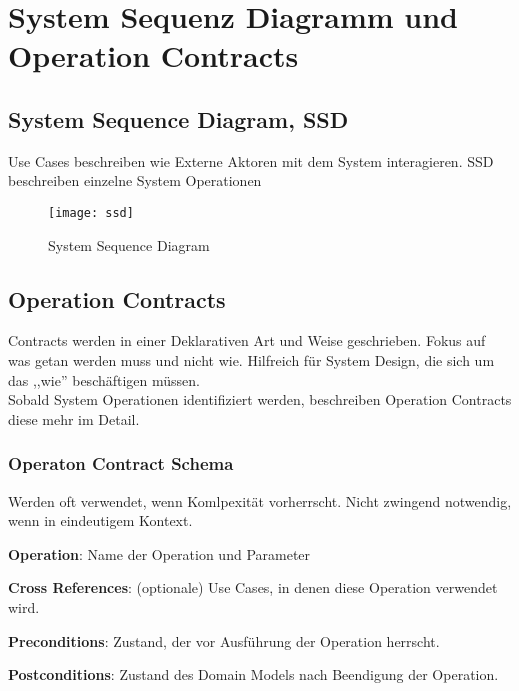 
\chapter{System Sequenz Diagramm und Operation Contracts}

\section{System Sequence Diagram, SSD}
Use Cases beschreiben wie Externe Aktoren mit dem System interagieren.
SSD beschreiben einzelne System Operationen

\begin{figure}[!h]
    \centering
    \texttt{[image: ssd]}
    \caption{System Sequence Diagram}
\end{figure}

\section{Operation Contracts}
Contracts werden in einer Deklarativen Art und Weise geschrieben. Fokus auf
was getan werden muss und nicht wie. Hilfreich für System Design, die sich um
das ,,wie'' beschäftigen müssen. \\
Sobald System Operationen identifiziert werden, beschreiben Operation Contracts
diese mehr im Detail.

\subsection{Operaton Contract Schema}
Werden oft verwendet, wenn Komlpexität vorherrscht. Nicht zwingend notwendig,
wenn in eindeutigem Kontext.
\begin{compactitem}
    \item \textbf{Operation}: Name der Operation und Parameter
    \item \textbf{Cross References}: (optionale) Use Cases, in denen diese Operation
    verwendet wird.
    \item \textbf{Preconditions}: Zustand, der vor Ausführung der Operation herrscht.
    \item \textbf{Postconditions}: Zustand des Domain Models nach Beendigung der
    Operation.
\end{compactitem}
